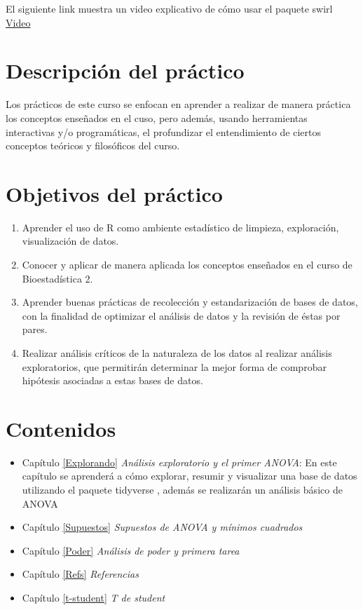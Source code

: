 \documentclass[]{book}
\begin{document}
El siguiente link muestra un video explicativo de cómo usar el paquete swirl \href{https://youtu.be/w6L7Ye18yPE}{Video}

\hypertarget{descripcion-del-practico}{%
\section{Descripción del práctico}\label{descripcion-del-practico}}

Los prácticos de este curso se enfocan en aprender a realizar de manera práctica los conceptos enseñados en el cuso, pero además, usando herramientas interactivas y/o programáticas, el profundizar el entendimiento de ciertos conceptos teóricos y filosóficos del curso.

\hypertarget{objetivos-del-practico}{%
\section{Objetivos del práctico}\label{objetivos-del-practico}}

\begin{enumerate}
\def\labelenumi{\arabic{enumi}.}
\item
  Aprender el uso de R como ambiente estadístico de limpieza, exploración, visualización de datos.
\item
  Conocer y aplicar de manera aplicada los conceptos enseñados en el curso de Bioestadística 2.
\item
  Aprender buenas prácticas de recolección y estandarización de bases de datos, con la finalidad de optimizar el análisis de datos y la revisión de éstas por pares.
\item
  Realizar análisis críticos de la naturaleza de los datos al realizar análisis exploratorios, que permitirán determinar la mejor forma de comprobar hipótesis asociadas a estas bases de datos.
\end{enumerate}

\hypertarget{contenidos}{%
\section{Contenidos}\label{contenidos}}

\begin{itemize}
\item
  Capítulo \ref{Explorando} \emph{Análisis exploratorio y el primer ANOVA}: En este capítulo se aprenderá a cómo explorar, resumir y visualizar una base de datos utilizando el paquete tidyverse \citep{WickhamTidy2017}, además se realizarán un análisis básico de ANOVA
\item
  Capítulo \ref{Supuestos} \emph{Supuestos de ANOVA y mínimos cuadrados}
\item
  Capítulo \ref{Poder} \emph{Análisis de poder y primera tarea}
\item
  Capítulo \ref{Refs} \emph{Referencias}
\item
  Capítulo \ref{t-student} \emph{T de student}
\end{itemize}
\end{document}
